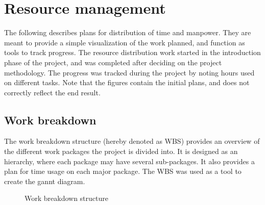 \clearpage

\section{Resource management}
\label{sec:process_and_methodology-resource_management}

The following describes plans for distribution of time and manpower. They are meant to provide a simple visualization of the work planned, and function as tools to track progress. The resource distribution work started in the introduction phase of the project, and was completed after deciding on the project methodology. The progress was tracked during the project by noting hours used on different tasks. Note that the figures contain the initial plans, and does not correctly reflect the end result.

\subsection{Work breakdown}
\label{subsec:process_and_methodology-resource_management-work_breakdown}

The work breakdown structure (hereby denoted as WBS) provides an overview of the different work packages the project is divided into. It is designed as an hierarchy, where each package may have several sub-packages. It also provides a plan for time usage on each major package. The WBS was used as a tool to create the gannt diagram.

\begin{center}
  \begin{figure}[ht!]
    \caption{Work breakdown structure}
    \label{fig:Work breakdown structure}
  \end{figure}
\end{center}


